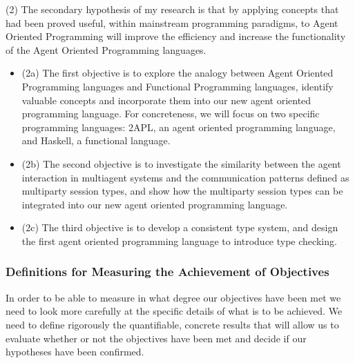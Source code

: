 \documentclass[a4paper,12pt,oneside,fleqn]{book} %
\begin{document}
(2) The secondary hypothesis of my research is that by applying concepts
that had been proved useful, within mainstream programming paradigms, to
Agent Oriented Programming will improve the efficiency and increase
the functionality of the Agent Oriented Programming languages. 
\begin{itemize}

  \item (2a) The first objective is to explore the analogy between Agent
    Oriented Programming languages and Functional Programming languages,
    identify valuable concepts and incorporate them into our new agent
    oriented programming language. For concreteness, we will focus on two
    specific programming languages: 2APL, an agent oriented programming
    language, and Haskell, a functional language. 

  \item (2b) The second objective is to investigate the similarity between
    the agent interaction in multiagent systems and the communication
    patterns defined as multiparty session types, and show how the
    multiparty session types can be integrated into our new agent oriented
    programming language.

  \item (2c) The third objective is to develop a consistent type system,
    and design the first agent oriented programming language to introduce
    type checking.

\end{itemize}

\subsubsection{Definitions for Measuring the Achievement of Objectives}%

In order to be able to measure in what degree our objectives have been met
we need to look more carefully at the specific details of what is to be
achieved. We need to define rigorously the quantifiable, concrete results
that will allow us to evaluate whether or not the objectives have been met
and decide if our hypotheses have been confirmed.

\end{document}
